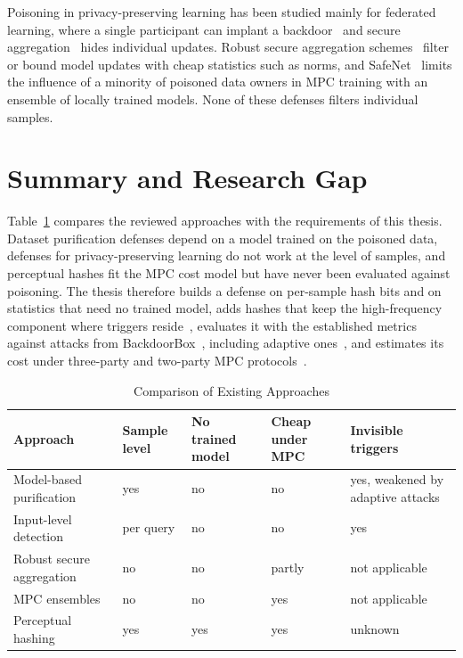Poisoning in privacy-preserving learning has been studied mainly for federated
learning, where a single participant can implant a
backdoor~\cite{bagdasaryan2020backdoorfl} and secure
aggregation~\cite{bonawitz2017secagg} hides individual updates. Robust secure
aggregation schemes~\cite{so2021brea,nguyen2022flame,lycklama2023rofl,rathee2023elsa}
filter or bound model updates with cheap statistics such as norms, and
SafeNet~\cite{chaudhari2023safenet} limits the influence of a minority of
poisoned data owners in MPC training with an ensemble of locally trained
models. None of these defenses filters individual samples.

\section{Summary and Research Gap}
\label{sec:lr-summary}

Table~\ref{tab:lr-gap} compares the reviewed approaches with the requirements of
this thesis. Dataset purification defenses depend on a model trained on the
poisoned data, defenses for privacy-preserving learning do not work at the level
of samples, and perceptual hashes fit the MPC cost model but have never been
evaluated against poisoning. The thesis therefore builds a defense on
per-sample hash bits and on statistics that need no trained model, adds hashes
that keep the high-frequency component where triggers
reside~\cite{zeng2021frequency}, evaluates it with the established metrics
against attacks from BackdoorBox~\cite{li2023backdoorbox}, including adaptive
ones~\cite{qi2023revisiting}, and estimates its cost under three-party and
two-party MPC protocols~\cite{mohassel2018aby3,cramer2018spdz2k}.

\begin{table}[htbp]
\centering
\caption{Comparison of Existing Approaches}
\label{tab:lr-gap}
\footnotesize
\begin{tabular}{>{\raggedright\arraybackslash}p{} >{\raggedright\arraybackslash}p{} >{\raggedright\arraybackslash}p{} >{\raggedright\arraybackslash}p{} >{\raggedright\arraybackslash}p{}}
\toprule
\textbf{Approach} & \textbf{Sample level} & \textbf{No trained model} & \textbf{Cheap under MPC} & \textbf{Invisible triggers} \\
\midrule
Model-based purification~\cite{tran2018spectral,chen2019activation,hayase2021spectre,tang2021scan,hou2025flare} & yes & no & no & yes, weakened by adaptive attacks \\
Input-level detection~\cite{gao2019strip,guo2023scaleup,hou2024ibdpsc} & per query & no & no & yes \\
Robust secure aggregation~\cite{so2021brea,nguyen2022flame,lycklama2023rofl,rathee2023elsa} & no & no & partly & not applicable \\
MPC ensembles~\cite{chaudhari2023safenet} & no & no & yes & not applicable \\
Perceptual hashing & yes & yes & yes & unknown \\
\bottomrule
\end{tabular}
\end{table}
